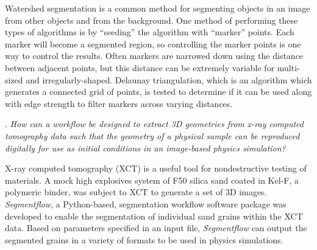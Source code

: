 Watershed segmentation is a
common method for segmenting objects in an image from other objects and
from the background. One method of performing these types of algorithms is
by ``seeding'' the algorithm with ``marker'' points. Each marker will become a
segmented region, so controlling the marker points is one way to control
the results. Often markers are narrowed down using the distance between
adjacent points, but this distance can be extremely variable for
multi-sized and irregularly-shaped. Delaunay triangulation, which is an
algorithm which generates a connected grid of points, is tested to
determine if it can be used along with edge strength to filter markers
across varying distances.

\bigskip
{}. \textit{
    How can a workflow be designed to extract 3D geometries from x-ray
    computed tomography data such that the geometry of a physical sample can be
    reproduced digitally for use as initial conditions in an image-based physics
    simulation?
}

X-ray computed tomography
(XCT) is a useful tool for nondestructive testing of materials. A mock
high explosives system of F50 silica sand coated in Kel-F, a
polymeric binder, was subject to XCT to generate a set of 3D images.
\textit{Segmentflow}, a Python-based, segmentation workflow software
package was
developed to enable the segmentation of individual sand grains within the
XCT data. Based on parameters specified in an input file,
\textit{Segmentflow} can
output the segmented grains in a variety of formats to be used in physics
simulations.

